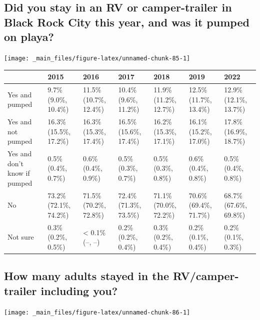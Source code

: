 \documentclass[
]{book}
\begin{document}
\hypertarget{did-you-stay-in-an-rv-or-camper-trailer-in-black-rock-city-this-year-and-was-it-pumped-on-playa}{%
\subsection{Did you stay in an RV or camper-trailer in Black Rock City this year, and was it pumped on playa?}\label{did-you-stay-in-an-rv-or-camper-trailer-in-black-rock-city-this-year-and-was-it-pumped-on-playa}}

\texttt{[image: \_main\_files/figure-latex/unnamed-chunk-85-1]}

\begin{table}
\centering
\begin{tabular}[t]{>{}l|>{}l|>{}l|>{}l|>{}l|>{}l|>{}l}
\hline
  & 2015 & 2016 & 2017 & 2018 & 2019 & 2022\\
\hline
Yes and pumped & 9.7\% (9.0\%, 10.4\%) & 11.5\% (10.7\%, 12.4\%) & 10.4\% (9.6\%, 11.2\%) & 11.9\% (11.2\%, 12.7\%) & 12.5\% (11.7\%, 13.4\%) & 12.9\% (12.1\%, 13.7\%)\\
\hline
Yes and not pumped & 16.3\% (15.5\%, 17.2\%) & 16.3\% (15.3\%, 17.4\%) & 16.5\% (15.6\%, 17.4\%) & 16.2\% (15.3\%, 17.1\%) & 16.1\% (15.2\%, 17.0\%) & 17.8\% (16.9\%, 18.7\%)\\
\hline
Yes and don't know if pumped & 0.5\% (0.4\%, 0.7\%) & 0.6\% (0.4\%, 0.9\%) & 0.5\% (0.3\%, 0.7\%) & 0.5\% (0.3\%, 0.8\%) & 0.6\% (0.4\%, 0.8\%) & 0.5\% (0.4\%, 0.8\%)\\
\hline
No & 73.2\% (72.1\%, 74.2\%) & 71.5\% (70.2\%, 72.8\%) & 72.4\% (71.3\%, 73.5\%) & 71.1\% (70.0\%, 72.2\%) & 70.6\% (69.4\%, 71.7\%) & 68.7\% (67.6\%, 69.8\%)\\
\hline
Not sure & 0.3\% (0.2\%, 0.5\%) & < 0.1\% (--, --) & 0.2\% (0.2\%, 0.4\%) & 0.3\% (0.2\%, 0.4\%) & 0.2\% (0.1\%, 0.4\%) & 0.2\% (0.1\%, 0.3\%)\\
\hline
\end{tabular}
\end{table}

\hypertarget{how-many-adults-stayed-in-the-rvcamper-trailer-including-you}{%
\subsection{How many adults stayed in the RV/camper-trailer including you?}\label{how-many-adults-stayed-in-the-rvcamper-trailer-including-you}}

\texttt{[image: \_main\_files/figure-latex/unnamed-chunk-86-1]}
\end{document}
